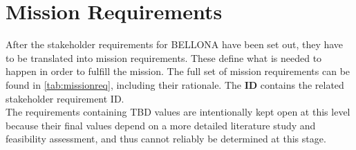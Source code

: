 \section{Mission Requirements}
After the stakeholder requirements for BELLONA have been set out, they have to be translated into mission requirements. These define what is needed to happen in order to fulfill the mission. The full set of mission requirements can be found in \autoref{tab:missionreq}, including their rationale. The \textbf{ID} contains the related stakeholder requirement ID.\\
The requirements containing TBD values are intentionally kept open at this level because their final values depend on a more detailed literature study and feasibility assessment, and thus cannot reliably be determined at this stage.

